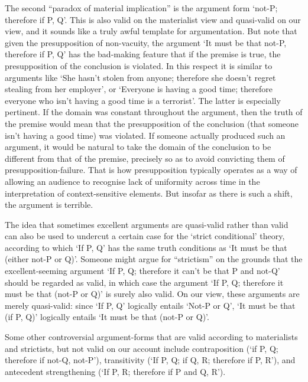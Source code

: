 \documentclass[If.tex]{subfiles}
\begin{document}
The second “paradox of material implication” is the argument form ‘not-P; therefore if P, Q’. This is also valid on the materialist view and quasi-valid on our view, and it sounds like a truly awful template for argumentation. But note that given the presupposition of non-vacuity, the argument ‘It must be that not-P, therefore if P, Q’ has the bad-making feature that if the premise is true, the presupposition of the conclusion is violated. In this respect it is similar to arguments like ‘She hasn't stolen from anyone; therefore she doesn't regret stealing from her employer’, or ‘Everyone is having a good time; therefore everyone who isn't having a good time is a terrorist’. The latter is especially pertinent. If the domain was constant throughout the argument, then the truth of the premise would mean that the presupposition of the conclusion (that someone isn't having a good time) was violated. If someone actually produced such an argument, it would be natural to take the domain of the conclusion to be different from that of the premise, precisely so as to avoid convicting them of presupposition-failure. That is how presupposition typically operates as a way of allowing an audience to recognise lack of uniformity across time in the interpretation of context-sensitive elements. But insofar as there is such a shift, the argument is terrible.

The idea that sometimes excellent arguments are quasi-valid rather than valid can also be used to undercut a certain case for the ‘strict conditional’ theory, according to which ‘If P, Q’ has the same truth conditions as ‘It must be that (either not-P or Q)’. Someone might argue for “strictism” on the grounds that the excellent-seeming argument ‘If P, Q; therefore it can't be that P and not-Q’ should be regarded as valid, in which case the argument ‘If P, Q; therefore it must be that (not-P or Q)’ is surely also valid. On our view, these arguments are merely quasi-valid: since ‘If P, Q’ logically entails ‘Not-P or Q’, ‘It must be that (if P, Q)’ logically entails ‘It must be that (not-P or Q)’.

Some other controversial argument-forms that are valid according to materialists and strictists, but not valid on our account include contraposition (‘if P, Q; therefore if not-Q, not-P’), transitivity (‘If P, Q; if Q, R; therefore if P, R’), and antecedent strengthening (‘If P, R; therefore if P and Q, R’).
\end{document}
